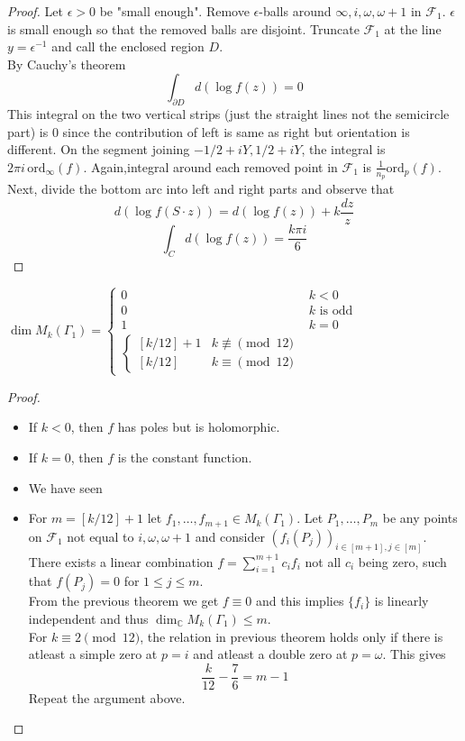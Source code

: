 \documentclass[oneside, 12pt]{scrbook}
\newcommand{\CC}{\mathbb C}
\theoremstyle{theorem}
\begin{document}
\begin{proof}
Let $\epsilon >0$ be "small enough". Remove $\epsilon$-balls around $\infty , i , \omega , \omega + 1$ in $\mathcal{F}_{1}$. $\epsilon$ is small enough so that the removed balls are disjoint. Truncate $\mathcal{F}_{1}$ at the line $y = \epsilon^{-1}$ and call the enclosed region $D$. \\
By Cauchy's theorem $$\int_{\partial D} d(\log f(z)) = 0$$ This integral on the two vertical strips (just the straight lines not the semicircle part) is $0$ since the contribution of left is same as right but orientation is different. On the segment joining $-1/2 + iY , 1/2 + iY$, the integral is $2 \pi i \,\mathrm{ord}_{\infty}(f)$. Again,integral around each removed point in $\mathcal{F}_{1}$ is $\frac{1}{n_{p}} \mathrm{ord}_{p}(f)$. Next, divide the bottom arc into left and right parts and observe that $$d(\log f(S\cdot z)) = d(\log f(z)) + k \frac{dz}{z}$$ $$\int_{C} d(\log f(z)) = \frac{k \pi i }{6}$$ 
\end{proof}

\begin{corollary}
$\dim M_{k}(\Gamma_{1}) = \begin{cases} 0 & k < 0 \\ 0 & k \text{ is odd } \\ 1 & k=0 \\ \begin{cases}[k/12]+1 & k\not \equiv \pmod{12} \\ [k/12] & k \equiv \pmod{12} \end{cases} \end{cases}$
\end{corollary}

\begin{proof}
\begin{itemize}
\item If $k <0$, then $f$ has poles but is holomorphic.
\item  If $k=0$, then $f$ is the constant function. 
\item We have seen
\item For $m = [k/12] + 1$ let $f_{1}, \hdots , f_{m+1} \in M_{k}(\Gamma_{1})$. Let $P_{1}, \hdots , P_{m}$ be any points on $\mathcal{F}_{1}$ not equal to $i , \omega , \omega + 1$ and consider $(f_{i}(P_{j}))_{i \in [m+1], j \in [m]}$. \\
There exists a linear combination $f = \sum_{i=1}^{m+1} c_{i}f_{i}$ not all $c_{i}$ being zero, such that $f(P_{j})=0$ for $1 \le j \le m$. \\
From the previous theorem we get $f \equiv 0$ and this implies $\{f_{i}\}$ is linearly independent and thus $\dim_{\CC} M_{k}(\Gamma_{1}) \le m$. \\
For $k \equiv 2 \pmod{12}$, the relation in previous theorem holds only if there is atleast a simple zero at $p=i$ and atleast a double zero at $p = \omega$. This gives $$\frac{k}{12} - \frac{7}{6} = m-1$$ Repeat the argument above.  
\end{itemize}
\end{proof}
\end{document}

